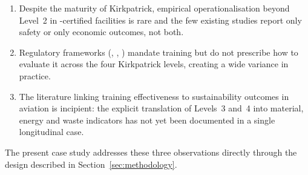 \begin{enumerate}[label=(\roman*)]
  \item Despite the maturity of Kirkpatrick, empirical operationalisation
        beyond Level~2 in \AS{}-certified \MRO{} facilities is rare and
        the few existing studies report only safety or only economic
        outcomes, not both.
  \item Regulatory frameworks (\FAA{}, \EASA{}, \ANAC{}) mandate training but
        do not prescribe how to evaluate it across the four Kirkpatrick
        levels, creating a wide variance in practice.
  \item The literature linking training effectiveness to sustainability
        outcomes in aviation \MRO{} is incipient: the explicit translation of
        Levels~3 and~4 into material, energy and waste indicators has not yet
        been documented in a single longitudinal case.
\end{enumerate}

The present case study addresses these three observations directly through
the design described in Section~\ref{sec:methodology}.
